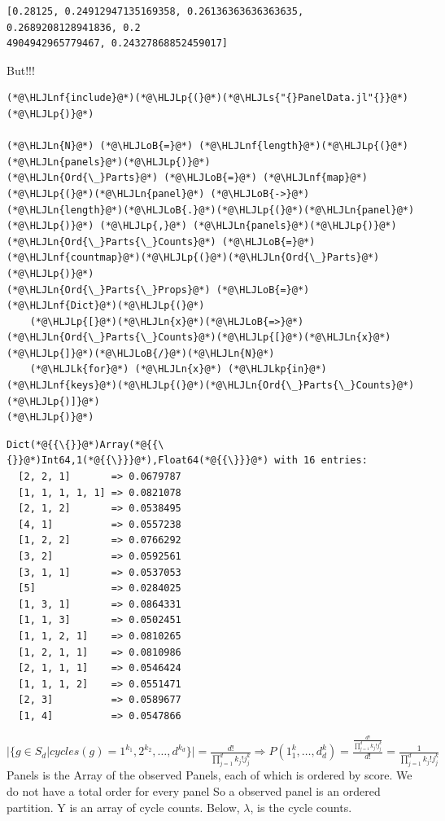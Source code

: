 \documentclass[12pt,a4paper]{article}
\newcommand{\HLJLk}[1]{\textcolor[RGB]{148,91,176}{\textbf{#1}}}
\newcommand{\HLJLkp}[1]{\textcolor[RGB]{148,91,176}{\textbf{#1}}}
\newcommand{\HLJLn}[1]{#1}
\newcommand{\HLJLnf}[1]{\textcolor[RGB]{66,102,213}{#1}}
\newcommand{\HLJLs}[1]{\textcolor[RGB]{201,61,57}{#1}}
\newcommand{\HLJLoB}[1]{\textcolor[RGB]{102,102,102}{\textbf{#1}}}
\newcommand{\HLJLp}[1]{#1}
\begin{document}
\begin{lstlisting}
[0.28125, 0.24912947135169358, 0.26136363636363635, 0.2689208128941836, 0.2
4904942965779467, 0.24327868852459017]
\end{lstlisting}


But!!!


\begin{lstlisting}
(*@\HLJLnf{include}@*)(*@\HLJLp{(}@*)(*@\HLJLs{"{}PanelData.jl"{}}@*)(*@\HLJLp{)}@*)

(*@\HLJLn{N}@*) (*@\HLJLoB{=}@*) (*@\HLJLnf{length}@*)(*@\HLJLp{(}@*)(*@\HLJLn{panels}@*)(*@\HLJLp{)}@*)
(*@\HLJLn{Ord{\_}Parts}@*) (*@\HLJLoB{=}@*) (*@\HLJLnf{map}@*)(*@\HLJLp{(}@*)(*@\HLJLn{panel}@*) (*@\HLJLoB{->}@*) (*@\HLJLn{length}@*)(*@\HLJLoB{.}@*)(*@\HLJLp{(}@*)(*@\HLJLn{panel}@*)(*@\HLJLp{)}@*) (*@\HLJLp{,}@*) (*@\HLJLn{panels}@*)(*@\HLJLp{)}@*)
(*@\HLJLn{Ord{\_}Parts{\_}Counts}@*) (*@\HLJLoB{=}@*) (*@\HLJLnf{countmap}@*)(*@\HLJLp{(}@*)(*@\HLJLn{Ord{\_}Parts}@*)(*@\HLJLp{)}@*)
(*@\HLJLn{Ord{\_}Parts{\_}Props}@*) (*@\HLJLoB{=}@*) (*@\HLJLnf{Dict}@*)(*@\HLJLp{(}@*)
	(*@\HLJLp{[}@*)(*@\HLJLn{x}@*)(*@\HLJLoB{=>}@*)(*@\HLJLn{Ord{\_}Parts{\_}Counts}@*)(*@\HLJLp{[}@*)(*@\HLJLn{x}@*)(*@\HLJLp{]}@*)(*@\HLJLoB{/}@*)(*@\HLJLn{N}@*) 
	(*@\HLJLk{for}@*) (*@\HLJLn{x}@*) (*@\HLJLkp{in}@*) (*@\HLJLnf{keys}@*)(*@\HLJLp{(}@*)(*@\HLJLn{Ord{\_}Parts{\_}Counts}@*)(*@\HLJLp{)]}@*)
(*@\HLJLp{)}@*)
\end{lstlisting}

\begin{lstlisting}
Dict(*@{{\{}}@*)Array(*@{{\{}}@*)Int64,1(*@{{\}}}@*),Float64(*@{{\}}}@*) with 16 entries:
  [2, 2, 1]       => 0.0679787
  [1, 1, 1, 1, 1] => 0.0821078
  [2, 1, 2]       => 0.0538495
  [4, 1]          => 0.0557238
  [1, 2, 2]       => 0.0766292
  [3, 2]          => 0.0592561
  [3, 1, 1]       => 0.0537053
  [5]             => 0.0284025
  [1, 3, 1]       => 0.0864331
  [1, 1, 3]       => 0.0502451
  [1, 1, 2, 1]    => 0.0810265
  [1, 2, 1, 1]    => 0.0810986
  [2, 1, 1, 1]    => 0.0546424
  [1, 1, 1, 2]    => 0.0551471
  [2, 3]          => 0.0589677
  [1, 4]          => 0.0547866
\end{lstlisting}


$|\{ g \ensuremath{\in} S_d | cycles(g) = 1^{k_1},2^{k_2},\ensuremath{\ldots},d^{k_d} \}| = \frac{d!}{\prod_{j=1}^{d} k_j!j^k_j } \ensuremath{\Longrightarrow} P(1^k_1, \ensuremath{\ldots} , d^k_d) = \frac{\frac{d!}{\prod_{j=1}^{d} k_j!j^k_j }}{d!} = \frac{1}{\prod_{j=1}^{d} k_j!j^k_j }$ Panels is the Array of the observed Panels, each of which is ordered by score. We do not have a total order for every panel So a observed panel is an ordered partition. Y is an array of cycle counts. Below, \ensuremath{\lambda}, is the cycle counts.
\end{document}
